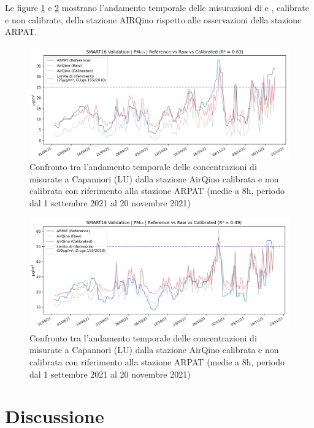 Le figure \ref{fig:val-pm2.5} e \ref{fig:val-pm10} mostrano l'andamento temporale delle misurazioni di  e , calibrate e non calibrate, della stazione AIRQino rispetto alle osservazioni della stazione ARPAT.

\begin{figure}[H]
\centering
\includegraphics[width=\textwidth,height=\textheight,keepaspectratio]{img/val_pm2.5}
\caption{Confronto tra l'andamento temporale delle concentrazioni di  misurate a Capannori (LU) dalla stazione AirQino calibrata e non calibrata con riferimento alla stazione ARPAT (medie a 8h, periodo dal 1 settembre 2021 al 20 novembre 2021)}
\label{fig:val-pm2.5}
\end{figure}

\begin{figure}[H]
\centering
\includegraphics[width=\textwidth,height=\textheight,keepaspectratio]{img/val_pm10}
\caption{Confronto tra l'andamento temporale delle concentrazioni di  misurate a Capannori (LU) dalla stazione AirQino calibrata e non calibrata con riferimento alla stazione ARPAT (medie a 8h, periodo dal 1 settembre 2021 al 20 novembre 2021)}
\label{fig:val-pm10}
\end{figure}

\section{Discussione}\label{sec:discussione}

